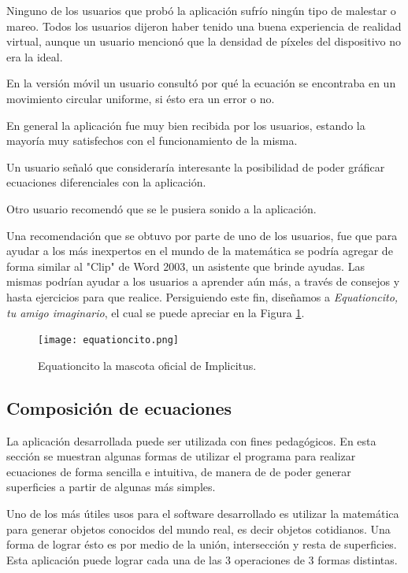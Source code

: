 \documentclass[12pt]{article}
\begin{document}
Ninguno de los usuarios que probó la aplicación sufrío ningún tipo de malestar o mareo. Todos los usuarios dijeron haber tenido una buena experiencia de realidad virtual, aunque un usuario mencionó que la densidad de píxeles del dispositivo no era la ideal.

En la versión móvil un usuario consultó por qué la ecuación se encontraba en un movimiento circular uniforme, si ésto era un error o no.

En general la aplicación fue muy bien recibida por los usuarios, estando la mayoría muy satisfechos con el funcionamiento de la misma.

Un usuario señaló que consideraría interesante la posibilidad de poder gráficar ecuaciones diferenciales con la aplicación. 

Otro usuario recomendó que se le pusiera sonido a la aplicación.

Una recomendación que se obtuvo por parte de uno de los usuarios, fue que para ayudar a los más inexpertos en el mundo de la matemática se podría agregar de forma similar al "Clip" de Word 2003, un asistente que brinde ayudas. Las mismas podrían ayudar a los usuarios a aprender aún más, a través de consejos y hasta ejercicios para que realice. Persiguiendo este fin, diseñamos a \textit{Equationcito, tu amigo imaginario}, el cual se puede apreciar en la Figura \ref{equationcito}.

\begin{figure}[h]
\texttt{[image: equationcito.png]}
\caption{Equationcito la mascota oficial de Implicitus.}
\label{equationcito}
\end{figure}


\subsection{Composición de ecuaciones}
\noindent La aplicación desarrollada puede ser utilizada con fines pedagógicos. En esta sección se muestran algunas formas de utilizar el programa para  realizar ecuaciones de forma sencilla e intuitiva, de manera de de poder generar superficies a partir de algunas más simples.

Uno de los más útiles usos para el software desarrollado es utilizar la matemática para generar objetos conocidos del mundo real, es decir objetos cotidianos. Una forma de lograr ésto es por medio de la unión, intersección y resta de superficies. Esta aplicación puede lograr cada una de las 3 operaciones de 3 formas distintas.
\end{document}
